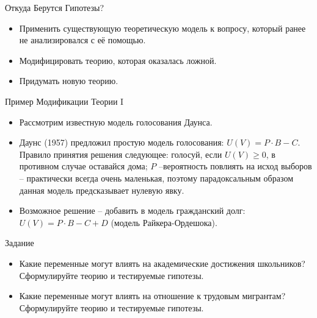 \documentclass{beamer}
\begin{document}
\begin{frame}{Откуда Берутся Гипотезы?}
\begin{itemize}
	\setlength\itemsep{1em}
	\item Применить существующую теоретическую модель к вопросу,  который ранее не анализировался с её помощью. 
	\item Модифицировать теорию,  которая оказалась ложной. 
	\item Придумать новую теорию. 
\end{itemize}
\end{frame}
\begin{frame}{Пример Модификации Теории I}
\begin{itemize}
	\setlength\itemsep{1em}
	\item Рассмотрим известную модель голосования Даунса.
	\item Даунс (1957) предложил простую модель голосования: $U(V)=P\cdot B - C$.  Правило принятия решения следующее: голосуй, если $U(V) \geqslant 0$, в противном случае оставайся дома; $P$ --вероятность повлиять на исход выборов -- практически всегда очень маленькая,  поэтому парадоксальным образом данная модель предсказывает нулевую явку. 
	\item Возможное решение -- добавить в модель гражданский долг: $U(V)=P\cdot B - C + D$ (модель Райкера-Ордешока). 
\end{itemize}
\end{frame}
\begin{frame}{Задание}
\begin{itemize}
	\setlength\itemsep{1em}
	\item Какие переменные могут влиять на академические достижения школьников? Сформулируйте теорию и тестируемые гипотезы. 
	\item Какие переменные могут влиять на отношение к трудовым мигрантам? Сформулируйте теорию и тестируемые гипотезы. 
\end{itemize}
\end{frame}
\end{document}
